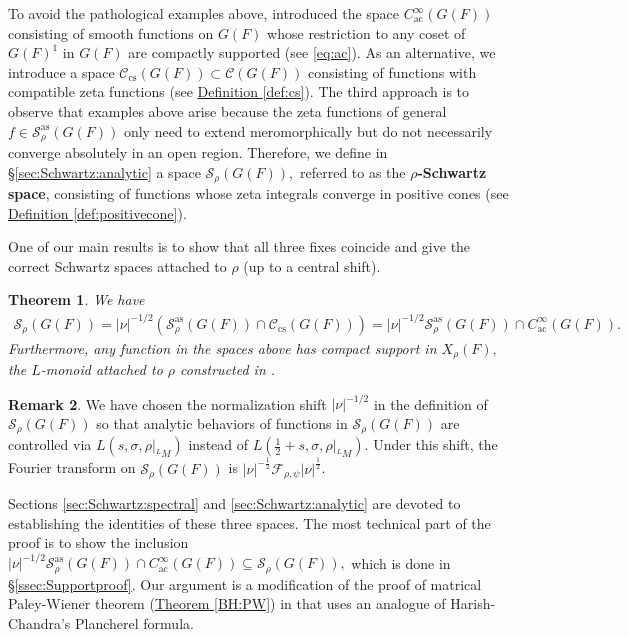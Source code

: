 \documentclass[10pt]{amsart}
\newtheorem{theorem}{Theorem}[section]
\theoremstyle{definition}
\newtheorem{remark}[theorem]{Remark}
\numberwithin{equation}{section}
\numberwithin{equation}{subsection}
\begin{document}
To avoid the pathological examples above, \cite{DRS} introduced the space $C^\infty_{\mathrm{ac}}(G(F))$ consisting of smooth functions on $G(F)$ whose restriction to any coset of $G(F)^1$ in $G(F)$ are compactly supported (see \eqref{eq:ac}). As an alternative, we introduce a space $\mathcal{C}_{\mathrm{cs}}(G(F))\subset \mathcal{C}(G(F))$ consisting of functions with compatible zeta functions (see \hyperref[def:cs]{Definition \ref{def:cs}}). The third approach is to observe that examples above arise because the zeta functions of general $f\in \mathcal{S}^{\mathrm{as}}_\rho(G(F))$ only need to extend meromorphically but do not necessarily converge absolutely in an open region. %
Therefore, we define in \S \ref{sec:Schwartz:analytic} a space $\mathcal{S}_\rho(G(F)),$ referred to as  the \textbf{$\rho$-Schwartz space},  consisting of functions whose zeta integrals converge in positive cones (see \hyperref[def:positivecone]{Definition \ref{def:positivecone}}).

One of our main results is to show that all three fixes coincide and give the correct Schwartz spaces attached to $\rho$ (up to a central shift).
\begin{theorem}\label{thm:main:compactsupport}
    We have
    \begin{align*}
        \mathcal{S}_\rho(G(F))=|\nu|^{-1/2}\left(\mathcal{S}_\rho^{\mathrm{as}}(G(F))\cap \mathcal{C}_{\mathrm{cs}}(G(F))\right)=|\nu|^{-1/2}\mathcal{S}_\rho^{\mathrm{as}}(G(F))\cap C^\infty_{\mathrm{ac}}(G(F)).
    \end{align*}
    Furthermore, any function in the spaces above has compact support in $X_{\rho}(F),$ the $L$-monoid attached to $\rho$ constructed in \cite[\S5]{Ngo:Hankel}.
\end{theorem}

\begin{remark}
    We have chosen the normalization shift $|\nu|^{-1/2}$ in the definition of $\mathcal{S}_\rho(G(F))$ so that analytic behaviors of functions in $\mathcal{S}_\rho(G(F))$ are controlled via $L(s,\sigma,\rho|_{{}^LM})$ instead of $L(\tfrac{1}{2}+s,\sigma,\rho|_{{}^LM}).$ Under this shift, the Fourier transform on $\mathcal{S}_\rho(G(F))$ is $|\nu|^{-\frac{1}{2}}\mathcal{F}_{\rho,\psi}|\nu|^{\frac{1}{2}}$.
\end{remark}

Sections \ref{sec:Schwartz:spectral} and  \ref{sec:Schwartz:analytic} are devoted to establishing the identities of these three spaces. The most technical part of the proof is to show the inclusion $|\nu|^{-1/2}\mathcal{S}_\rho^{\mathrm{as}}(G(F))\cap C^\infty_{\mathrm{ac}}(G(F))\subseteq \mathcal{S}_\rho(G(F)),$ which is done in \S \ref{ssec:Supportproof}. Our argument is a modification of the proof of matrical Paley-Wiener theorem (\hyperref[BH:PW]{Theorem \ref{BH:PW}}) in \cite{Heiermann:HeckePlan} that uses an analogue of Harish-Chandra's Plancherel formula. 
\end{document}
